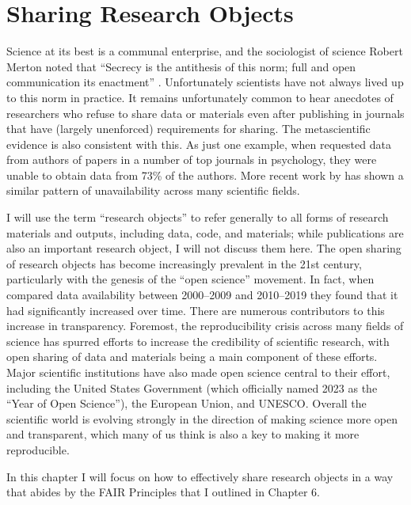 \chapter{Sharing Research Objects}

Science at its best is a communal enterprise, and the sociologist of science Robert Merton noted that ``Secrecy is the
antithesis of this norm; full and open communication its enactment'' \citep{Merton:1942aa}.  Unfortunately scientists have not always lived up to this norm in practice.  It remains unfortunately common to hear anecdotes of researchers who refuse to share data or materials even after publishing in journals that have (largely unenforced) requirements for sharing.  The metascientific evidence is also consistent with this.  As just one example, when \cite{Wicherts:2006aa} requested data from authors of papers in a number of top journals in psychology, they were unable to obtain data from 73\% of the authors.  More recent work by \cite{Tedersoo:2021aa} has shown a similar pattern of unavailability across many scientific fields.

I will use the term ``research objects'' to refer generally to all forms of research materials and outputs, including data, code, and materials; while publications are also an important research object, I will not discuss them here. The open sharing of research objects has become increasingly prevalent in the 21st century, particularly with the genesis of the ``open science'' movement.  In fact, when \cite{Tedersoo:2021aa} compared data availability between 2000--2009 and 2010--2019 they found that it had significantly increased over time.  There are numerous contributors to this increase in transparency. Foremost, the reproducibility crisis across many fields of science has spurred efforts to increase the credibility of scientific research, with open sharing of data and materials being a main component of these efforts.  Major scientific institutions have also made open science central to their effort, including the United States Government (which officially named 2023 as the ``Year of Open Science''), the European Union, and UNESCO.  Overall the scientific world is evolving strongly in the direction of making science more open and transparent, which many of us think is also a key to making it more reproducible.

In this chapter I will focus on how to effectively share research objects in a way that abides by the FAIR Principles that I outlined in Chapter 6.

